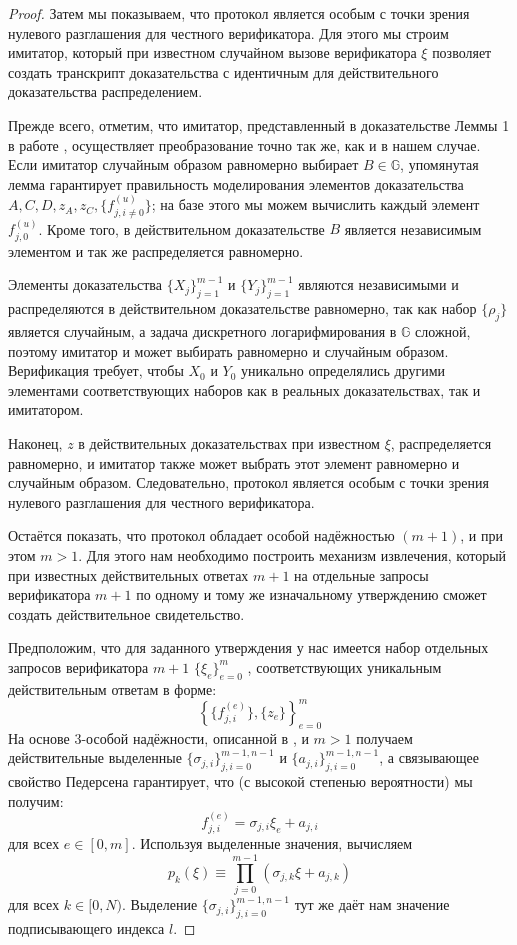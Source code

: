 \documentclass{article}
\newcommand{\G}{\mathbb{G}}
\theoremstyle{definition}
\begin{document}
\begin{proof}
Затем мы показываем, что протокол является особым с точки зрения нулевого разглашения для честного верификатора.
Для этого мы строим имитатор, который при известном случайном вызове верификатора $\xi$ позволяет создать транскрипт доказательства с идентичным для действительного доказательства распределением.

Прежде всего, отметим, что имитатор, представленный в доказательстве Леммы 1 в работе \cite{bootle} , осуществляет преобразование точно так же, как и в нашем случае.
Если имитатор случайным образом равномерно выбирает $B \in \G$, упомянутая лемма гарантирует правильность моделирования элементов доказательства $A,C,D,z_A,z_C,\{f^{(u)}_{j,i \neq 0}\}$; на базе этого мы можем вычислить каждый элемент $f^{(u)}_{j,0}$.
Кроме того, в действительном доказательстве $B$ является независимым элементом и так же распределяется равномерно.

Элементы доказательства $\{X_j\}_{j=1}^{m-1}$ и $\{Y_j\}_{j=1}^{m-1}$ являются независимыми и распределяются в действительном доказательстве равномерно, так как набор $\{\rho_j\}$ является случайным, а задача дискретного логарифмирования в \begin{math}\mathbb{G}\end{math} сложной, поэтому имитатор и может выбирать равномерно и случайным образом. Верификация требует, чтобы $X_0$ и $Y_0$ уникально определялись другими элементами соответствующих наборов как в реальных доказательствах, так и имитатором.

Наконец, $z$ в действительных доказательствах при известном $\xi$, распределяется равномерно, и имитатор также может выбрать этот элемент равномерно и случайным образом. Следовательно, протокол является особым с точки зрения нулевого разглашения для честного верификатора.

Остаётся показать, что протокол обладает особой надёжностью $(m+1)$, и при этом $m > 1$.
Для этого нам необходимо построить механизм извлечения, который при известных действительных ответах $m+1$ на отдельные запросы верификатора $m+1$ по одному и тому же изначальному утверждению сможет создать действительное свидетельство.

Предположим, что для заданного утверждения у нас имеется набор отдельных запросов верификатора $m+1$ $\{\xi_e\}_{e=0}^m$ , соответствующих уникальным действительным ответам в форме:
$$\left\{ \{f^{(e)}_{j,i}\}, \{z_e\} \right\}_{e=0}^m$$
На основе $3$-особой надёжности, описанной в \cite{bootle}, и $m > 1$ получаем действительные выделенные $\{\sigma_{j,i}\}_{j,i=0}^{m-1,n-1}$ и $\{a_{j,i}\}_{j,i=0}^{m-1,n-1}$, а связывающее свойство Педерсена гарантирует, что (с высокой степенью вероятности) мы получим:
$$f^{(e)}_{j,i} = \sigma_{j,i}\xi_e + a_{j,i}$$
для всех $e \in [0,m]$.
Используя выделенные значения, вычисляем
$$p_k(\xi) \equiv \prod_{j=0}^{m-1} \left( \sigma_{j,k}\xi + a_{j,k} \right)$$
для всех $k \in [0,N)$.
Выделение $\{\sigma_{j,i}\}_{j,i=0}^{m-1,n-1}$ тут же даёт нам значение подписывающего индекса $l$.


\end{proof}
\end{document}
